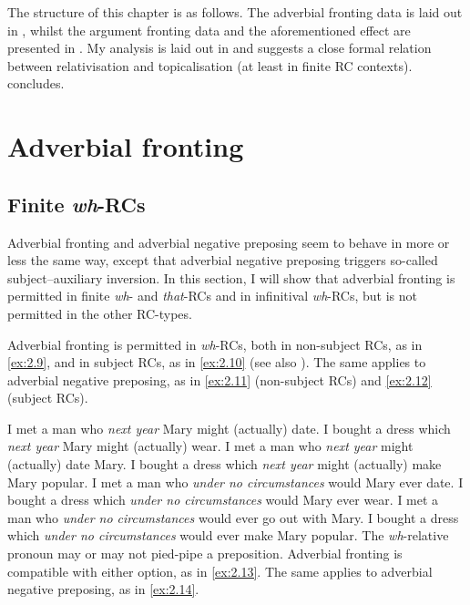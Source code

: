 \documentclass[output=paper]{langsci/langscibook}
\begin{document}
The structure of this chapter is as follows. The adverbial
fronting data is laid out in , whilst
the argument fronting data and the aforementioned 
effect are presented in . My analysis is laid out in
 and suggests a close formal relation between relativisation
and topicalisation (at least in finite \gls{RC}
contexts).  concludes.

\section{Adverbial fronting}\label{sec:02.2}

\subsection{Finite \emph{wh}-RCs}\label{sec:02.2.1}

Adverbial fronting and adverbial negative preposing seem to behave in more or
less the same way, except that adverbial negative preposing triggers so-called
subject--auxiliary inversion. In this section, I will show that adverbial
fronting is permitted in finite \emph{wh}- and \emph{that}-\glspl{RC} and in
infinitival \emph{wh}{-RCs, but is not permitted in the other RC-types.}

Adverbial fronting is permitted in \emph{wh}{-RCs, b}oth in non-subject RCs, as
in \eqref{ex:2.9}, and in subject RCs, as in \eqref{ex:2.10} (see also
\citealt{Doherty1993,Doherty2000}). The same
applies to adverbial negative preposing, as in \eqref{ex:2.11} (non-subject RCs) and \eqref{ex:2.12}
(subject RCs).

\ea\label{ex:2.9}
    \ea    I met a man who \textit{next year} Mary might (actually) date.
    \ex    I bought a dress which \textit{next year} Mary might (actually) wear.
    \z
\ex\label{ex:2.10}
    \ea    I met a man who \textit{next year} might (actually) date Mary.
    \ex    I bought a dress which \textit{next year} might (actually) make Mary popular.
    \z
\ex\label{ex:2.11}
    \ea    I met a man who \textit{under no circumstances} would Mary ever date.
    \ex    I bought a dress which \textit{under no circumstances} would Mary ever wear.
    \z
\ex\label{ex:2.12}
    \ea    I met a man who \textit{under no circumstances} would ever go out with Mary.
    \ex    I bought a dress which \textit{under no circumstances} would ever make Mary popular.
    \z
\z
The \emph{wh}-relative pronoun may or may not pied-pipe a preposition.
Adverbial fronting is compatible with either option, as in \eqref{ex:2.13}. The same
applies to adverbial negative preposing, as in \eqref{ex:2.14}.
\end{document}
